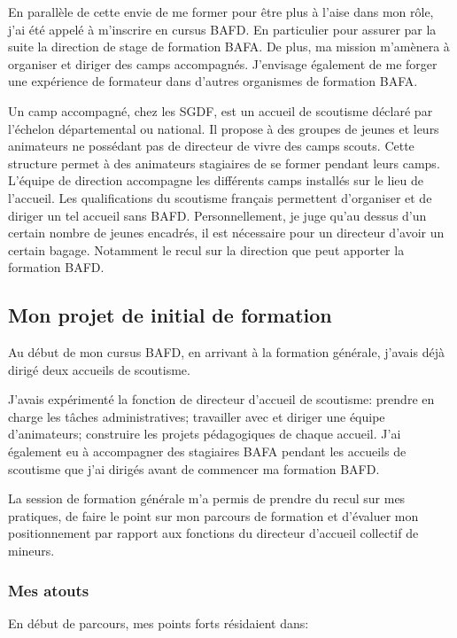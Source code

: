 \documentclass[titlepage,11pt,a4paper]{article}
\begin{document}
En parallèle de cette envie de me former pour être plus à l'aise dans mon rôle,
j'ai été appelé à m'inscrire en cursus BAFD\@. En particulier pour assurer par la suite la
direction de stage de formation BAFA\@. De plus, ma mission m'amènera à organiser et
diriger des camps accompagnés.  J'envisage également de me forger une expérience de formateur dans d'autres organismes de
formation BAFA\@.

Un camp accompagné, chez les SGDF, est un accueil de scoutisme déclaré par l'échelon
départemental ou national. Il propose à des groupes de jeunes et leurs animateurs
ne possédant pas de directeur de vivre des camps scouts. Cette structure permet à
des animateurs stagiaires de se former pendant leurs camps. L'équipe de direction accompagne les différents
camps installés sur le lieu de l'accueil. Les qualifications du scoutisme français
permettent d'organiser et de diriger un tel accueil sans BAFD\@. Personnellement, je
juge qu'au dessus d'un certain nombre de jeunes encadrés, il est nécessaire pour un
directeur d'avoir un certain bagage. Notamment le recul sur la
direction que peut apporter la formation BAFD\@.

\subsection{Mon projet de initial de formation}

Au début de mon cursus BAFD, en arrivant à la formation générale, j'avais déjà dirigé deux
accueils de scoutisme.

J'avais expérimenté la fonction de directeur d'accueil de scoutisme:
prendre en charge les tâches administratives; travailler avec et diriger une équipe d'animateurs;
construire les projets pédagogiques de chaque accueil. J'ai également eu à accompagner des
stagiaires BAFA pendant les accueils de scoutisme que j'ai dirigés avant de commencer ma
formation BAFD\@.

La session de formation générale m'a permis de prendre du recul sur mes pratiques, de
faire le point sur mon parcours de formation et d'évaluer mon positionnement par rapport
aux fonctions du directeur d'accueil collectif de mineurs.

\subsubsection{Mes atouts}

En début de parcours, mes points forts résidaient dans:
\end{document}
